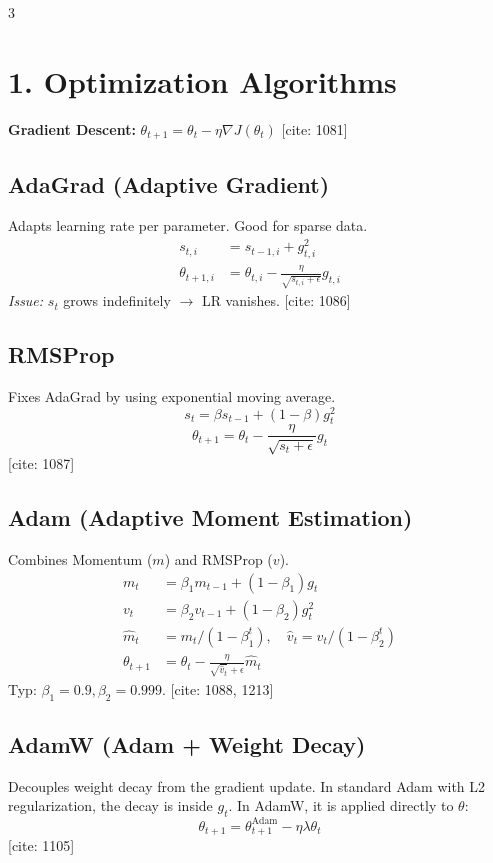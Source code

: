 \documentclass[10pt,landscape]{article}
\begin{document}
\scriptsize
\begin{multicols*}{3}

\section*{1. Optimization Algorithms}
\textbf{Gradient Descent:} $\theta_{t+1} = \theta_t - \eta \nabla J(\theta_t)$ [cite: 1081]

\subsection*{AdaGrad (Adaptive Gradient)}
Adapts learning rate per parameter. Good for sparse data.
\begin{align*}
    s_{t, i} &= s_{t-1, i} + g_{t, i}^2 \\
    \theta_{t+1, i} &= \theta_{t, i} - \frac{\eta}{\sqrt{s_{t, i} + \epsilon}} g_{t, i}
\end{align*}
\textit{Issue:} $s_t$ grows indefinitely $\to$ LR vanishes. [cite: 1086]

\subsection*{RMSProp}
Fixes AdaGrad by using exponential moving average.
$$ s_t = \beta s_{t-1} + (1-\beta)g_t^2 $$
$$ \theta_{t+1} = \theta_t - \frac{\eta}{\sqrt{s_t + \epsilon}} g_t $$
[cite: 1087]

\subsection*{Adam (Adaptive Moment Estimation)}
Combines Momentum ($m$) and RMSProp ($v$).
\begin{align*}
    m_t &= \beta_1 m_{t-1} + (1-\beta_1)g_t \\
    v_t &= \beta_2 v_{t-1} + (1-\beta_2)g_t^2 \\
    \hat{m}_t &= m_t / (1-\beta_1^t), \quad \hat{v}_t = v_t / (1-\beta_2^t) \\
    \theta_{t+1} &= \theta_t - \frac{\eta}{\sqrt{\hat{v}_t} + \epsilon} \hat{m}_t
\end{align*}
Typ: $\beta_1=0.9, \beta_2=0.999$. [cite: 1088, 1213]

\subsection*{AdamW (Adam + Weight Decay)}
Decouples weight decay from the gradient update.
In standard Adam with L2 regularization, the decay is inside $g_t$. In AdamW, it is applied directly to $\theta$:
$$ \theta_{t+1} = \theta_{t+1}^{\text{Adam}} - \eta \lambda \theta_t $$
[cite: 1105]


\end{multicols*}
\end{document}
